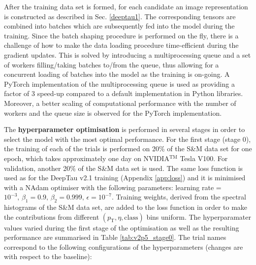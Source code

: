 After the training data set is formed, for each \tauh candidate an image representation is constructed as described in Sec. \ref{deeptau1}. The corresponding tensors are combined into batches which are subsequently fed into the model during the training. Since the batch shaping procedure is performed on the fly, there is a challenge of how to make the data loading procedure time-efficient during the gradient updates. This is solved by introducing a multiprocessing queue and a set of workers filling/taking batches to/from the queue, thus allowing for a concurrent loading of batches into the model as the training is on-going. A PyTorch \cite{NEURIPS2019_9015} implementation of the multiprocessing queue is used as providing a factor of 3 speed-up compared to a default implementation in Python libraries. Moreover, a better scaling of computational performance with the number of workers and the queue size is observed for the PyTorch implementation. 

The \textbf{hyperparameter optimisation} is performed in several stages in order to select the model with the most optimal performance. For the first stage (stage 0), the training of each of the trials is performed on 20\% of the S\&M data set for one epoch, which takes approximately one day on NVIDIA$^\text{TM}$ Tesla V100. For validation, another 20\% of the S\&M data set is used. The same loss function is used as for the DeepTau v2.1 training (Appendix \ref{app:loss}) and it is minimised with a NAdam optimiser with the following parameters: learning rate = $10^{-3}, \, \beta_1 = 0.9, \, \beta_2 = 0.999, \,  \epsilon=10^{-7}$. Training weights, derived from the spectral histograms of the S\&M data set, are added to the loss function in order to make the contributions from different $(p_\text{T}, \eta, \text{class})$ bins uniform. The hyperparamater values varied during the first stage of the optimisation as well as the resulting performance are summarised in Table \ref{tab:v2p5_stage0}. The trial names correspond to the following configurations of the hyperparameters (changes are with respect to the baseline):

